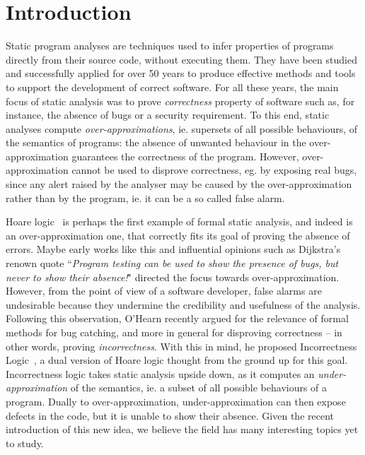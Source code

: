 
\chapter{Introduction}\label{ch:intro}
Static program analyses are techniques used to infer properties of programs directly from their source code, without executing them. They have been studied and successfully applied for over 50 years to produce effective methods and tools to support the development of correct software. %
For all these years, the main focus of static analysis was to prove \emph{correctness} property of software such as, for instance, the absence of bugs or a security requirement. To this end, static analyses compute \emph{over-approximations}, ie. supersets of all possible behaviours, of the semantics of programs: the absence of unwanted behaviour in the over-approximation guarantees the correctness of the program. However, over-approximation cannot be used to disprove correctness, eg. by exposing real bugs, since any alert raised by the analyser may be caused by the over-approximation rather than by the program, ie. it can be a so called  false alarm.

Hoare logic~\cite{Hoare69} is perhaps the first example of formal static analysis, and indeed is an over-approximation one, that correctly fits its goal of proving the absence of errors. Maybe early works like this and influential opinions such as Dijkstra's renown quote ``\textit{Program testing can be used to show the presence of bugs, but never to show their absence!}" \cite{EWD249} directed the focus towards over-approximation.
However, from the point of view of a software developer, false alarms are undesirable because they undermine the credibility and usefulness of the analysis.
Following this observation, O'Hearn recently argued for the relevance of formal methods for bug catching, and more in general for disproving correctness -- in other words, proving \emph{incorrectness}. With this in mind, he proposed Incorrectness Logic~\cite{OHearn20}, a dual version of Hoare logic thought from the ground up for this goal.
Incorrectness logic takes static analysis upside down, as it computes an \emph{under-approximation} of the semantics, ie. a subset of all possible behaviours of a program. Dually to over-approximation, under-approximation can then expose defects in the code, but it is unable to show their absence.
Given the recent introduction of this new idea, we believe the field has many interesting topics yet to study.

